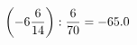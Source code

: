 \documentclass[preview]{standalone}
\begin{document}
\begin{align*}
\left( -6 { 6 \over 14 } \right)  :  { 6 \over 70 } = -65.0
\end{align*}
\end{document}
